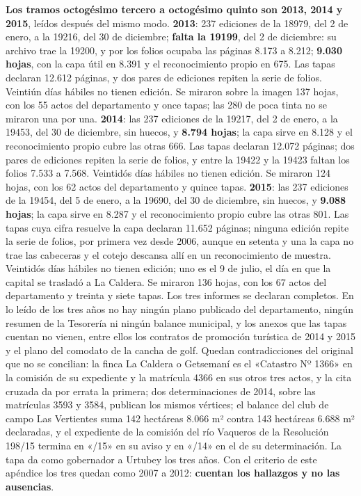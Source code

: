 \textbf{Los tramos octogésimo tercero a octogésimo quinto son 2013, 2014 y 2015}, leídos después del mismo modo. \textbf{2013}: 237 ediciones de la 18979, del 2 de enero, a la 19216, del 30 de diciembre; \textbf{falta la 19199}, del 2 de diciembre: su archivo trae la 19200, y por los folios ocupaba las páginas 8.173 a 8.212; \textbf{9.030 hojas}, con la capa útil en 8.391 y el reconocimiento propio en 675. Las tapas declaran 12.612 páginas, y dos pares de ediciones repiten la serie de folios. Veintiún días hábiles no tienen edición. Se miraron sobre la imagen 137 hojas, con los 55 actos del departamento y once tapas; las 280 de poca tinta no se miraron una por una. \textbf{2014}: las 237 ediciones de la 19217, del 2 de enero, a la 19453, del 30 de diciembre, sin huecos, y \textbf{8.794 hojas}; la capa sirve en 8.128 y el reconocimiento propio cubre las otras 666. Las tapas declaran 12.072 páginas; dos pares de ediciones repiten la serie de folios, y entre la 19422 y la 19423 faltan los folios 7.533 a 7.568. Veintidós días hábiles no tienen edición. Se miraron 124 hojas, con los 62 actos del departamento y quince tapas. \textbf{2015}: las 237 ediciones de la 19454, del 5 de enero, a la 19690, del 30 de diciembre, sin huecos, y \textbf{9.088 hojas}; la capa sirve en 8.287 y el reconocimiento propio cubre las otras 801. Las tapas cuya cifra resuelve la capa declaran 11.652 páginas; ninguna edición repite la serie de folios, por primera vez desde 2006, aunque en setenta y una la capa no trae las cabeceras y el cotejo descansa allí en un reconocimiento de muestra. Veintidós días hábiles no tienen edición; uno es el 9 de julio, el día en que la capital se trasladó a La Caldera. Se miraron 136 hojas, con los 67 actos del departamento y treinta y siete tapas. Los tres informes se declaran completos. En lo leído de los tres años no hay ningún plano publicado del departamento, ningún resumen de la Tesorería ni ningún balance municipal, y los anexos que las tapas cuentan no vienen, entre ellos los contratos de promoción turística de 2014 y 2015 y el plano del comodato de la cancha de golf. Quedan contradicciones del original que no se concilian: la finca La Caldera o Getsemaní es el «Catastro Nº 1366» en la comisión de su expediente y la matrícula 4366 en sus otros tres actos, y la cita cruzada da por errata la primera; dos determinaciones de 2014, sobre las matrículas 3593 y 3584, publican los mismos vértices; el balance del club de campo Las Vertientes suma 142 hectáreas 8.066 m² contra 143 hectáreas 6.688 m² declaradas, y el expediente de la comisión del río Vaqueros de la Resolución 198/15 termina en «/15» en su aviso y en «/14» en el de su determinación. La tapa da como gobernador a Urtubey los tres años. Con el criterio de este apéndice los tres quedan como 2007 a 2012: \textbf{cuentan los hallazgos y no las ausencias}.

